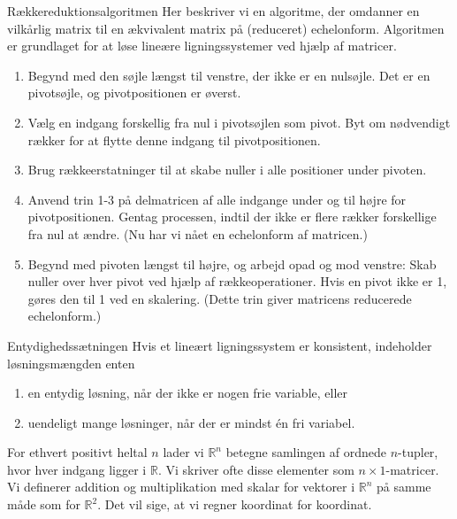 \begin{custombox}{Rækkereduktionsalgoritmen}
    Her beskriver vi en algoritme, der omdanner en vilkårlig matrix til en ækvivalent
    matrix på (reduceret) echelonform. Algoritmen er grundlaget for at løse lineære ligningssystemer ved hjælp af matricer.

    \begin{enumerate}
        \item Begynd med den søjle længst til venstre, der ikke er en nulsøjle. Det er en pivotsøjle, og pivotpositionen er øverst.
        \item Vælg en indgang forskellig fra nul i pivotsøjlen som pivot. Byt om nødvendigt rækker for at flytte denne indgang til pivotpositionen.
        \item Brug rækkeerstatninger til at skabe nuller i alle positioner under pivoten.
        \item Anvend trin 1-3 på delmatricen af alle indgange under og til højre for pivotpositionen. Gentag processen, indtil der ikke er flere rækker forskellige fra nul at ændre. (Nu har vi nået en echelonform af matricen.)
        \item Begynd med pivoten længst til højre, og arbejd opad og mod venstre: Skab nuller over hver pivot ved hjælp af rækkeoperationer. Hvis en pivot ikke er 1, gøres den til 1 ved en skalering. (Dette trin giver matricens reducerede echelonform.)
    \end{enumerate}

\end{custombox}

\begin{theorem}{Entydighedssætningen}
    Hvis et lineært ligningssystem er konsistent, indeholder løsningsmængden enten
    \begin{enumerate}[label=(\roman*)]
        \item en entydig løsning, når der ikke er nogen frie variable, eller
        \item uendeligt mange løsninger, når der er mindst én fri variabel.
    \end{enumerate}
\end{theorem}


\begin{definition}
    For ethvert positivt heltal $n$ lader vi $\mathbb{R}^n$ betegne samlingen af ordnede $n$-tupler, hvor hver indgang ligger i $\mathbb{R}$. Vi skriver ofte disse elementer som $n \times 1$-matricer. Vi definerer addition og multiplikation med skalar for vektorer i $\mathbb{R}^n$ på samme måde som for $\mathbb{R}^2$. Det vil sige, at vi regner koordinat for koordinat.
\end{definition}

